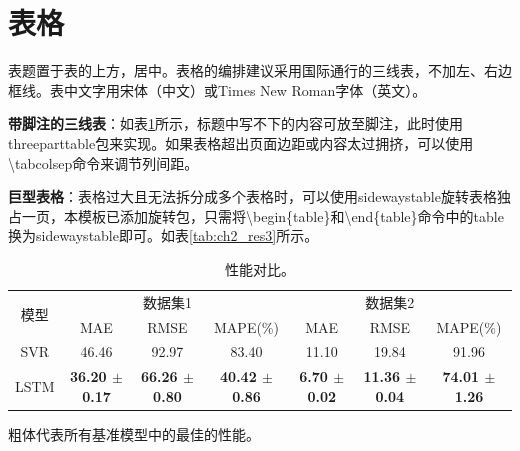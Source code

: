 \section{表格}

表题置于表的上方，居中。表格的编排建议采用国际通行的三线表，不加左、右边框线。表中文字用宋体（中文）或Times New Roman字体（英文）。

\textbf{带脚注的三线表}：如表\ref{tab:ch2_res1}所示，标题中写不下的内容可放至脚注，此时使用threeparttable包来实现。如果表格超出页面边距或内容太过拥挤，可以使用\textbackslash tabcolsep命令来调节列间距。

\textbf{巨型表格}：表格过大且无法拆分成多个表格时，可以使用sidewaystable旋转表格独占一页，本模板已添加旋转包，只需将\textbackslash begin\{table\}和\textbackslash end\{table\}命令中的table换为sidewaystable即可。如表\ref{tab:ch2_res3}所示。


\begin{table}[!htb]
	\centering
	\small %
	\caption{性能对比。}
	\begin{threeparttable}
		\begin{tabular}{c|ccc|ccc}
			\toprule
			\multirow{2}{*}{模型} &  & 数据集1 &  &  & 数据集2&  \\
			& MAE & RMSE & MAPE(\%) & MAE & RMSE & MAPE(\%) \\
			\midrule
			
			SVR & 46.46 & 92.97 & 83.40 & 11.10 & 19.84 & 91.96  \\
			LSTM & \textbf{36.20 $\pm$0.17} & \textbf{66.26 $\pm$0.80} & \textbf{40.42 $\pm$0.86} & \textbf{6.70 $\pm$0.02} & \textbf{11.36 $\pm$0.04} & \textbf{74.01 $\pm$1.26}  \\
			\bottomrule
		\end{tabular}
		\begin{tablenotes}
			\footnotesize
			\item[*] 粗体代表所有基准模型中的最佳的性能。
		\end{tablenotes}
	\end{threeparttable}
	\label{tab:ch2_res1}
\end{table}



